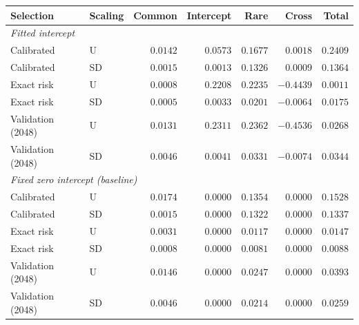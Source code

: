 \begin{tabular}{llrrrrr}
\toprule
Selection & Scaling & Common & Intercept & Rare & Cross & Total \\
\midrule
\multicolumn{7}{l}{\emph{Fitted intercept}} \\
Calibrated & U & $0.0142$ & $0.0573$ & $0.1677$ & $0.0018$ & $0.2409$ \\
Calibrated & SD & $0.0015$ & $0.0013$ & $0.1326$ & $0.0009$ & $0.1364$ \\
Exact risk & U & $0.0008$ & $0.2208$ & $0.2235$ & $-0.4439$ & $0.0011$ \\
Exact risk & SD & $0.0005$ & $0.0033$ & $0.0201$ & $-0.0064$ & $0.0175$ \\
Validation (2048) & U & $0.0131$ & $0.2311$ & $0.2362$ & $-0.4536$ & $0.0268$ \\
Validation (2048) & SD & $0.0046$ & $0.0041$ & $0.0331$ & $-0.0074$ & $0.0344$ \\
\midrule
\multicolumn{7}{l}{\emph{Fixed zero intercept (baseline)}} \\
Calibrated & U & $0.0174$ & $0.0000$ & $0.1354$ & $0.0000$ & $0.1528$ \\
Calibrated & SD & $0.0015$ & $0.0000$ & $0.1322$ & $0.0000$ & $0.1337$ \\
Exact risk & U & $0.0031$ & $0.0000$ & $0.0117$ & $0.0000$ & $0.0147$ \\
Exact risk & SD & $0.0008$ & $0.0000$ & $0.0081$ & $0.0000$ & $0.0088$ \\
Validation (2048) & U & $0.0146$ & $0.0000$ & $0.0247$ & $0.0000$ & $0.0393$ \\
Validation (2048) & SD & $0.0046$ & $0.0000$ & $0.0214$ & $0.0000$ & $0.0259$ \\
\bottomrule
\end{tabular}
